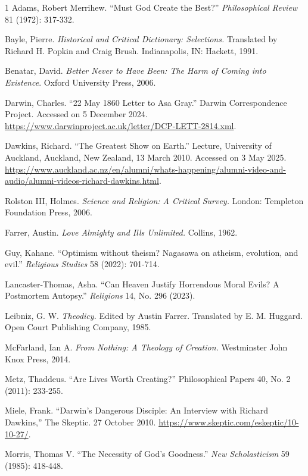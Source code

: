\begin{hangparas}{\hangingindent}{1}
Adams, Robert Merrihew. ``Must God Create the Best?''
\emph{Philosophical Review} 81 (1972): 317-332.

Bayle, Pierre. \emph{Historical and Critical Dictionary: Selections.}
Translated by Richard H. Popkin and Craig Brush. Indianapolis, IN:
Hackett, 1991.

Benatar, David. \emph{Better Never to Have Been: The Harm of Coming into
Existence}. Oxford University Press, 2006.

Darwin, Charles. ``22 May 1860 Letter to Asa Gray.'' Darwin
Correspondence Project. Accessed on 5 December 2024.
\newline
\url{https://www.darwinproject.ac.uk/letter/DCP-LETT-2814.xml}.

Dawkins, Richard. ``The Greatest Show on Earth.'' Lecture, University of
Auckland, Auckland, New Zealand, 13 March 2010. Accessed on 3 May 2025.
\newline
\url{https://www.auckland.ac.nz/en/alumni/whats-happening/alumni-video-and-audio/alumni-videos-richard-dawkins.html}.

Rolston III, Holmes. \emph{Science and Religion: A Critical Survey.}
London: Templeton Foundation Press, 2006.

Farrer, Austin. \emph{Love Almighty and Ills Unlimited.} Collins, 1962.

Guy, Kahane. ``Optimism without theism? Nagasawa on atheism, evolution,
and evil.'' \emph{Religious Studies} 58 (2022): 701-714.

Lancaster-Thomas, Asha. ``Can Heaven Justify Horrendous Moral Evils? A
Postmortem Autopsy.'' \emph{Religions} 14, No. 296 (2023).

Leibniz, G. W. \emph{Theodicy.} Edited by Austin Farrer. Translated by
E. M. Huggard. Open Court Publishing Company, 1985.

McFarland, Ian A. \emph{From Nothing: A Theology of Creation.}
Westminster John Knox Press, 2014.

Metz, Thaddeus. ``Are Lives Worth Creating?'' Philosophical Papers 40,
No. 2 (2011): 233-255.

Miele, Frank. ``Darwin's Dangerous Disciple: An Interview with Richard
Dawkins,'' The Skeptic. 27 October 2010.
\newline
\url{https://www.skeptic.com/eskeptic/10-10-27/}.

Morris, Thomas V. ``The Necessity of God's Goodness.'' \emph{New
Scholasticism} 59 (1985): 418-448.


\end{hangparas}
